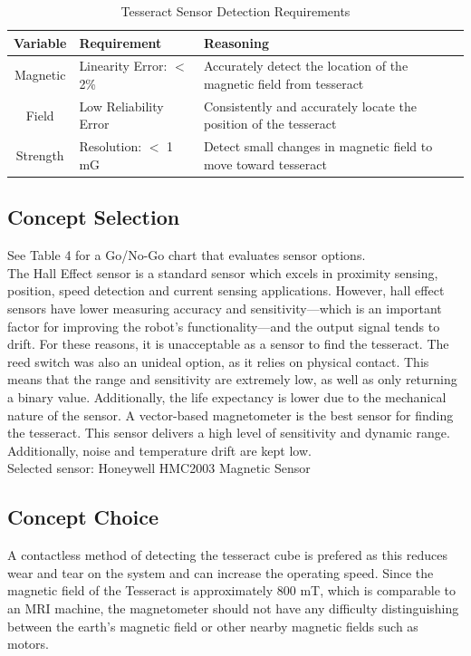 \documentclass[12pt]{article}
\begin{document}
\begin{table}[htbp]
  \centering
  \caption{Tesseract Sensor Detection Requirements}
    \begin{tabular}{c|p{11.5em}|p{29.89em}}
    \multicolumn{1}{p{5.5em}|}{\textbf{Variable}} & \textbf{Requirement} & \textbf{Reasoning} \bigstrut[b]\\
    \hline
    Magnetic & Linearity Error: $<$ 2\% & Accurately detect the location of the magnetic field from tesseract \bigstrut[t]\\
    Field  & Low Reliability Error & Consistently and accurately locate the position of the tesseract \\
    Strength & Resolution: $<$ 1 mG & Detect small changes in magnetic field to move toward tesseract \\
    \end{tabular}%
  \label{tab:addlabel}%
\end{table}%


\subsection{Concept Selection}
See Table 4 for a Go/No-Go chart that evaluates sensor options.\\ 
The Hall Effect sensor is a standard sensor which excels in proximity sensing, position, speed detection and current sensing applications. However, hall effect sensors have lower measuring accuracy and sensitivity—which is an important factor for improving the robot’s functionality—and the output signal tends to drift. For these reasons, it is unacceptable as a sensor to find the tesseract.
The reed switch was also an unideal option, as it relies on physical contact. This means that the range and sensitivity are extremely low, as well as only returning a binary value. Additionally, the life expectancy is lower due to the mechanical nature of the sensor.
A vector-based magnetometer is the best sensor for finding the tesseract. This sensor delivers a high level of sensitivity and dynamic range. Additionally, noise and temperature drift are kept low. \\
Selected sensor: Honeywell HMC2003 Magnetic Sensor

\subsection{Concept Choice}
A contactless method of detecting the tesseract cube is prefered as this reduces wear and tear on the system and can increase the operating speed. Since the magnetic field of the Tesseract is approximately 800 mT, which is comparable to an MRI machine, the magnetometer should not have any difficulty distinguishing between the earth’s magnetic field or other nearby magnetic fields such as motors.
\end{document}
